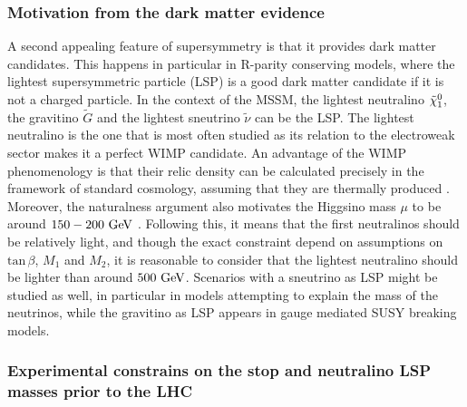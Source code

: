     \subsubsection{Motivation from the dark matter evidence}

    A second appealing feature of supersymmetry is that it provides dark matter
    candidates. This happens in particular in R-parity conserving models, where the
    lightest supersymmetric particle (LSP) is a good dark matter candidate if it is
    not a charged particle. In the context of the MSSM, the lightest neutralino
    $\tilde{\chi}_1^0$, the gravitino $\tilde{G}$ and the lightest sneutrino $\tilde{\nu}$
    can be the LSP. The lightest neutralino is the one that is most often studied as its
    relation to the electroweak sector makes it a perfect WIMP candidate.
    An advantage of the WIMP phenomenology is that their relic density can be calculated
    precisely in the framework of standard cosmology, assuming that they are thermally produced
    \cite{EllisDarkMatter}.
    Moreover, the naturalness argument also motivates the Higgsino mass $\mu$ to be around
    $150-200~\text{GeV}$ \cite{NaturalSUSYAndDarkMatter}. Following this, it means that the first
    neutralinos should be relatively light, and though the exact constraint
    depend on assumptions on $\text{tan}\, \beta$, $M_1$ and $M_2$, it is reasonable to
    consider that the lightest neutralino should be lighter than around $500~\text{GeV}$.
    Scenarios with a sneutrino as LSP might be studied as well, in particular in models
    attempting to explain the mass of the neutrinos, while the gravitino as LSP appears
    in gauge mediated SUSY breaking models.

    \subsubsection{Experimental constrains on the stop and neutralino LSP masses prior to
    the LHC}

